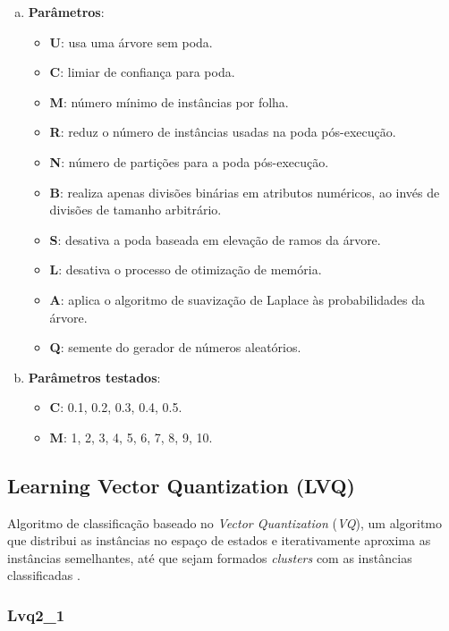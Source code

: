 \begin{enumerate}[a)]
    \item \textbf{Parâmetros}:
        \begin{itemize}
            \item \textbf{U}: usa uma árvore sem poda.
            \item \textbf{C}: limiar de confiança para poda.
            \item \textbf{M}: número mínimo de instâncias por folha.
            \item \textbf{R}: reduz o número de instâncias usadas na poda pós-execução.
            \item \textbf{N}: número de partições para a poda pós-execução.
            \item \textbf{B}: realiza apenas divisões binárias em atributos numéricos, ao invés de divisões de tamanho arbitrário.
            \item \textbf{S}: desativa a poda baseada em elevação de ramos da árvore.
            \item \textbf{L}: desativa o processo de otimização de memória.
            \item \textbf{A}: aplica o algoritmo de suavização de Laplace às probabilidades da árvore.
            \item \textbf{Q}: semente do gerador de números aleatórios.
        \end{itemize}
    \item \textbf{Parâmetros testados}:
        \begin{itemize}
            \item \textbf{C}: 0.1, 0.2, 0.3, 0.4, 0.5.
            \item \textbf{M}: 1, 2, 3, 4, 5, 6, 7, 8, 9, 10.
        \end{itemize}
\end{enumerate}

\subsection{Learning Vector Quantization (LVQ)}

Algoritmo de classificação baseado no \emph{Vector Quantization} (\emph{VQ}), um algoritmo que distribui as instâncias no espaço de estados e iterativamente aproxima as instâncias semelhantes, até que sejam formados \emph{clusters} com as instâncias classificadas \cite{Kohonen1997}.

\subsubsection{Lvq2\_1}

